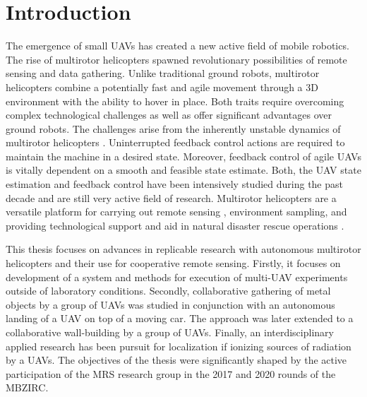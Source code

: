 \documentclass[a4paper,11pt,titlepage,twoside]{book}
\newcommand{\chapternoclear}[1]{
  \begingroup
  \let\cleardoublepage\clearpage
  \chapter{#1}
  \endgroup
}
\newcommand{\conditionalClearPage}{
  \ifdefined\printversion
  \clearemptydoublepage
  \else
  \newpage{}
  \clearpage
  \fi
}
\begin{document}


\conditionalClearPage


\conditionalClearPage


\conditionalClearPage


\pagestyle{fancy}

\conditionalClearPage
\tableofcontents



\chapternoclear{Introduction}

The emergence of small \acp{UAV} has created a new active field of mobile robotics.
The rise of multirotor helicopters spawned revolutionary possibilities of remote sensing and data gathering.
Unlike traditional ground robots, multirotor helicopters combine a potentially fast and agile movement through a 3D environment with the ability to hover in place.
Both traits require overcoming complex technological challenges as well as offer significant advantages over ground robots.
The challenges arise from the inherently unstable dynamics of multirotor helicopters \cite{kumar2012opportunities, mueller2014stability}.
Uninterrupted feedback control actions are required to maintain the machine in a desired state.
Moreover, feedback control of agile \acp{UAV} is vitally dependent on a smooth and feasible state estimate.
Both, the \ac{UAV} state estimation \cite{merino2006vision, burri2015robust, grabe2015nonlinear} and feedback control \cite{lee2010geometric, goodarzi2015geometric, kamel2017robust} have been intensively studied during the past decade and are still very active field of research.
Multirotor helicopters are a versatile platform for carrying out remote sensing \cite{colomina2014unmanned, pajares2015overview}, environment sampling, and providing technological support and aid in natural disaster rescue operations \cite{yuan2015survey, perks2016advances}.

This thesis focuses on advances in replicable research with autonomous multirotor helicopters and their use for cooperative remote sensing.
Firstly, it focuses on development of a system and methods for execution of multi-\ac{UAV} experiments outside of laboratory conditions.
Secondly, collaborative gathering of metal objects by a group of \acp{UAV} was studied in conjunction with an autonomous landing of a \ac{UAV} on top of a moving car.
The approach was later extended to a collaborative wall-building by a group of \acp{UAV}.
Finally, an interdisciplinary applied research has been pursuit for localization if ionizing sources of radiation by a \acp{UAV}.
The objectives of the thesis were significantly shaped by the active participation of the \ac{MRS} research group in the 2017 and 2020 rounds of the \ac{MBZIRC}.
\end{document}

